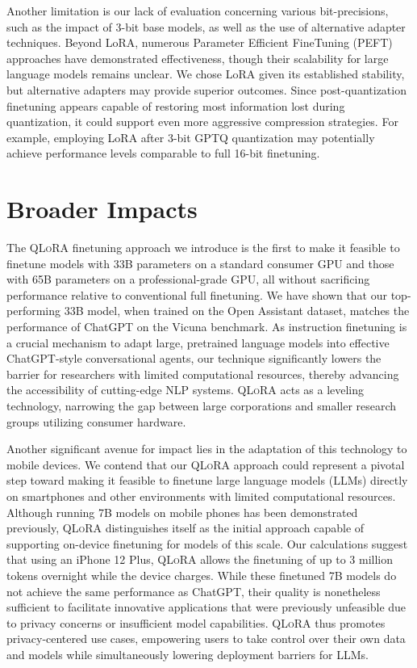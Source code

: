 Another limitation is our lack of evaluation concerning various bit-precisions, such as the impact of 3-bit base models, as well as the use of alternative adapter techniques. Beyond LoRA, numerous Parameter Efficient FineTuning (PEFT) approaches have demonstrated effectiveness, though their scalability for large language models remains unclear. We chose LoRA given its established stability, but alternative adapters may provide superior outcomes. Since post-quantization finetuning appears capable of restoring most information lost during quantization, it could support even more aggressive compression strategies. For example, employing LoRA after 3-bit GPTQ quantization may potentially achieve performance levels comparable to full 16-bit finetuning.

\section{Broader Impacts}

The \textsc{QLoRA} finetuning approach we introduce is the first to make it feasible to finetune models with 33B parameters on a standard consumer GPU and those with 65B parameters on a professional-grade GPU, all without sacrificing performance relative to conventional full finetuning. We have shown that our top-performing 33B model, when trained on the Open Assistant dataset, matches the performance of ChatGPT on the Vicuna benchmark. As instruction finetuning is a crucial mechanism to adapt large, pretrained language models into effective ChatGPT-style conversational agents, our technique significantly lowers the barrier for researchers with limited computational resources, thereby advancing the accessibility of cutting-edge NLP systems. \textsc{QLoRA} acts as a leveling technology, narrowing the gap between large corporations and smaller research groups utilizing consumer hardware.

Another significant avenue for impact lies in the adaptation of this technology to mobile devices. We contend that our \textsc{QLoRA} approach could represent a pivotal step toward making it feasible to finetune large language models (LLMs) directly on smartphones and other environments with limited computational resources. Although running 7B models on mobile phones has been demonstrated previously, \textsc{QLoRA} distinguishes itself as the initial approach capable of supporting on-device finetuning for models of this scale. Our calculations suggest that using an iPhone 12 Plus, \textsc{QLoRA} allows the finetuning of up to 3 million tokens overnight while the device charges. While these finetuned 7B models do not achieve the same performance as ChatGPT, their quality is nonetheless sufficient to facilitate innovative applications that were previously unfeasible due to privacy concerns or insufficient model capabilities. \textsc{QLoRA} thus promotes privacy-centered use cases, empowering users to take control over their own data and models while simultaneously lowering deployment barriers for LLMs.

